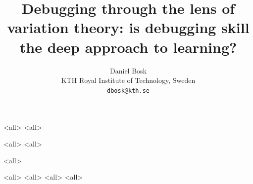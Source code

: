\documentclass[ignoreframetext]{beamer}
\begin{document}
\title{%
  Debugging through the lens of variation theory:
  is debugging skill the deep approach to learning?%
}
\author{%
  Daniel Bosk
  \\KTH Royal Institute of Technology, Sweden
  \\\texttt{dbosk@kth.se}
}

\mode*

\begin{frame}
  \maketitle
\end{frame}

\begin{abstract}
  
\end{abstract}

\begin{frame}
  \tableofcontents[subsectionstyle=hide,subsubsectionstyle=hide]
\end{frame}

\mode<all>{}
\mode<all>{}

\mode<all>{}
\mode<all>{}

\mode<all>{}

\mode<all>{}
\mode<all>{}
\mode<all>{}
\mode<all>{}

\begin{frame}[allowframebreaks]
\printbibliography
\end{frame}
\end{document}
